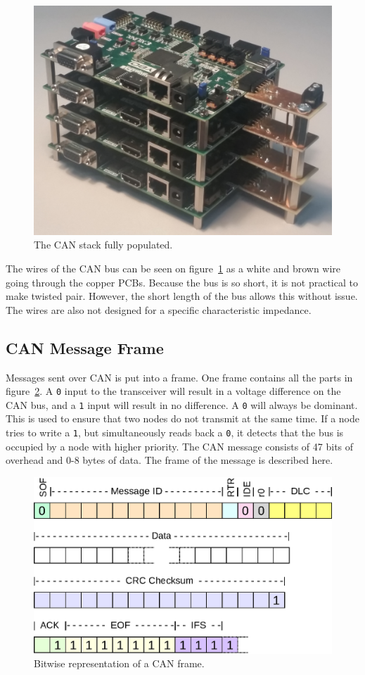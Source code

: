 \begin{figure}[H]
	\centering
	\includegraphics[width = 0.6\linewidth]{graphics/CAN_stack_picture}
	\caption{The CAN stack fully populated.}
	\label{fig:CAN_stack_picture}
\end{figure}

The wires of the CAN bus can be seen on figure~\ref{fig:CAN_stack_picture} as a white and brown wire going through the copper PCBs.
Because the bus is so short, it is not practical to make twisted pair.
However, the short length of the bus allows this without issue.
The wires are also not designed for a specific characteristic impedance.

\subsection{CAN Message Frame}\label{sub:CanMessageFrame}
Messages sent over CAN is put into a frame. 
One frame contains all the parts in figure~\ref{fig:CAN_frame_pdf}.
A \texttt{0} input to the transceiver will result in a voltage difference on the CAN bus, and a \texttt{1} input will result in no difference. 
A \texttt{0} will always be dominant.
This is used to ensure that two nodes do not transmit at the same time.
If a node tries to write a \texttt{1}, but simultaneously reads back a \texttt{0}, it detects that the bus is occupied by a node with higher priority.
The CAN message consists of 47 bits of overhead and 0-8 bytes of data. 
The frame of the message is described here.

\begin{figure}[h!]
	\centering
	\includegraphics[width = 0.9\linewidth]{graphics/CAN_frame}
	\caption{Bitwise representation of a CAN frame.}
	\label{fig:CAN_frame_pdf}
\end{figure}

